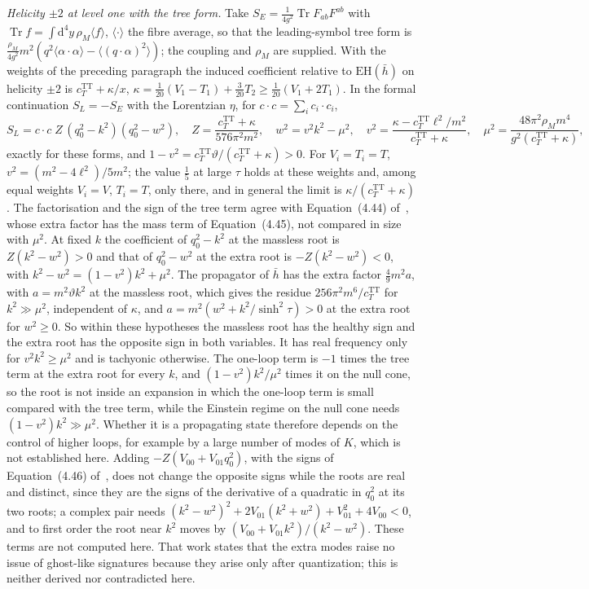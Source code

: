 \emph{Helicity \(\pm2\) at level one with the tree form.} Take \(S_E=\tfrac1{4g^2}\operatorname{Tr}F_{ab}F^{ab}\) with \(\operatorname{Tr}f=\int\mathrm d^4y\,\rho_M\langle f\rangle\), \(\langle\cdot\rangle\) the fibre average, so that the leading-symbol tree form is \(\tfrac{\rho_M}{4g^2}m^2(q^2\langle\alpha\cdot\alpha\rangle-\langle(q\cdot\alpha)^2\rangle)\); the coupling and \(\rho_M\) are supplied. With the weights of the preceding paragraph the induced coefficient relative to \(\mathrm{EH}(\bar h)\) on helicity \(\pm2\) is \(c_T^{\mathrm{TT}}+\kappa/x\), \(\kappa=\tfrac1{20}(V_1-T_1)+\tfrac3{20}T_2\ge\tfrac1{20}(V_1+2T_1)\). In the formal continuation \(S_L=-S_E\) with the Lorentzian \(\eta\), for \(c\cdot c=\sum_ic_i\cdot c_i\),
\[
S_L=c\cdot c\;Z\,(q_0^2-k^2)(q_0^2-w^2),\quad
Z=\frac{c_T^{\mathrm{TT}}+\kappa}{576\pi^2m^2},\quad
w^2=v^2k^2-\mu^2,\quad
v^2=\frac{\kappa-c_T^{\mathrm{TT}}\ell^2/m^2}{c_T^{\mathrm{TT}}+\kappa},\quad
\mu^2=\frac{48\pi^2\rho_Mm^4}{g^2(c_T^{\mathrm{TT}}+\kappa)},
\]
exactly for these forms, and \(1-v^2=c_T^{\mathrm{TT}}\vartheta/(c_T^{\mathrm{TT}}+\kappa)>0\). For \(V_i=T_i=T\), \(v^2=(m^2-4\ell^2)/5m^2\); the value \(\tfrac15\) at large \(\tau\) holds at these weights and, among equal weights \(V_i=V\), \(T_i=T\), only there, and in general the limit is \(\kappa/(c_T^{\mathrm{TT}}+\kappa)\). The factorisation and the sign of the tree term agree with Equation~(4.44) of~\cite{Steinacker2026}, whose extra factor has the mass term of Equation~(4.45), not compared in size with \(\mu^2\). At fixed \(k\) the coefficient of \(q_0^2-k^2\) at the massless root is \(Z(k^2-w^2)>0\) and that of \(q_0^2-w^2\) at the extra root is \(-Z(k^2-w^2)<0\), with \(k^2-w^2=(1-v^2)k^2+\mu^2\). The propagator of \(\bar h\) has the extra factor \(\tfrac49m^2a\), with \(a=m^2\vartheta k^2\) at the massless root, which gives the residue \(256\pi^2m^6/c_T^{\mathrm{TT}}\) for \(k^2\gg\mu^2\), independent of \(\kappa\), and \(a=m^2(w^2+k^2/\sinh^2\tau)>0\) at the extra root for \(w^2\ge0\). So within these hypotheses the massless root has the healthy sign and the extra root has the opposite sign in both variables. It has real frequency only for \(v^2k^2\ge\mu^2\) and is tachyonic otherwise. The one-loop term is \(-1\) times the tree term at the extra root for every \(k\), and \((1-v^2)k^2/\mu^2\) times it on the null cone, so the root is not inside an expansion in which the one-loop term is small compared with the tree term, while the Einstein regime on the null cone needs \((1-v^2)k^2\gg\mu^2\). Whether it is a propagating state therefore depends on the control of higher loops, for example by a large number of modes of \(K\), which is not established here. Adding \(-Z(V_{00}+V_{01}q_0^2)\), with the signs of Equation~(4.46) of~\cite{Steinacker2026}, does not change the opposite signs while the roots are real and distinct, since they are the signs of the derivative of a quadratic in \(q_0^2\) at its two roots; a complex pair needs \((k^2-w^2)^2+2V_{01}(k^2+w^2)+V_{01}^2+4V_{00}<0\), and to first order the root near \(k^2\) moves by \((V_{00}+V_{01}k^2)/(k^2-w^2)\). These terms are not computed here. That work states that the extra modes raise no issue of ghost-like signatures because they arise only after quantization; this is neither derived nor contradicted here.

